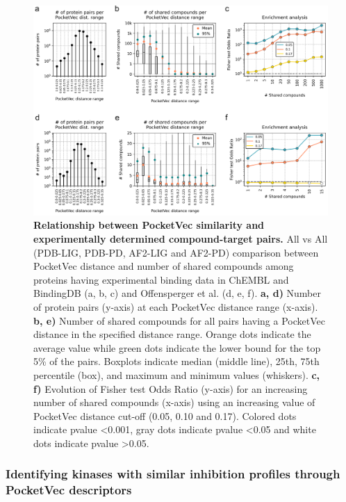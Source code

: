 \begin{figure}[htbp]
  \centering
  \includegraphics[width=\linewidth]{figures/PocketVec/Main/Fig6.png} 
  \caption{
    \textbf{Relationship between PocketVec similarity and experimentally determined compound-target pairs.}
    All vs All (PDB-LIG, PDB-PD, AF2-LIG and AF2-PD) comparison between PocketVec distance and number of shared compounds among proteins having experimental binding data in ChEMBL and BindingDB (a, b, c) and Offensperger et al.\cite{offensperger_large-scale_2024} (d, e, f).
    \textbf{a, d)} Number of protein pairs (y-axis) at each PocketVec distance range (x-axis).
    \textbf{b, e)} Number of shared compounds for all pairs having a PocketVec distance in the specified distance range. Orange dots indicate the average value while green dots indicate the lower bound for the top 5\% of the pairs. Boxplots indicate median (middle line), 25th, 75th percentile (box), and maximum and minimum values (whiskers). 
    \textbf{c, f)} Evolution of Fisher test Odds Ratio (y-axis) for an increasing number of shared compounds (x-axis) using an increasing value of PocketVec distance cut-off (0.05, 0.10 and 0.17). Colored dots indicate pvalue <0.001, gray dots indicate pvalue <0.05 and white dots indicate pvalue >0.05.
  }
  \label{PocketVec_Fig6}
\end{figure}


\subsubsection{Identifying kinases with similar inhibition profiles through PocketVec descriptors}
\label{PocketVec_ResultsAndDiscussion_Identifying_Kinases}

